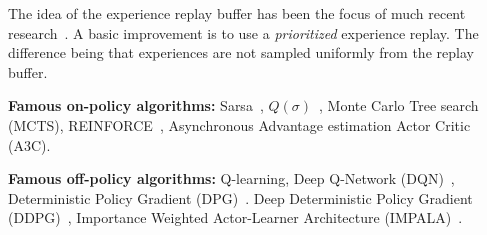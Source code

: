\documentclass{../main.tex}{}
\begin{document}
The idea of the experience replay buffer has been the focus of much recent research~\citep{Schaul2015, Hessel2017}. A basic improvement is to use a \textit{prioritized} experience replay. The difference being that experiences are not sampled uniformly from the replay buffer.



\textbf{Famous on-policy algorithms:} Sarsa~\citep{Sutton1998}, $Q(\sigma)$~\citep{Deasis2017}, Monte Carlo Tree search (MCTS), REINFORCE~\citep{Williams1992}, Asynchronous Advantage estimation Actor Critic (A3C).

\textbf{Famous off-policy algorithms:} Q-learning, Deep Q-Network (DQN)~\citep{Mnih2013}, Deterministic Policy Gradient (DPG)~\citep{Silver2014}. Deep Deterministic Policy Gradient (DDPG)~\citep{Lillicrap2015}, Importance Weighted Actor-Learner Architecture (IMPALA)~\citep{Espeholt2018}.


% 
\end{document}
